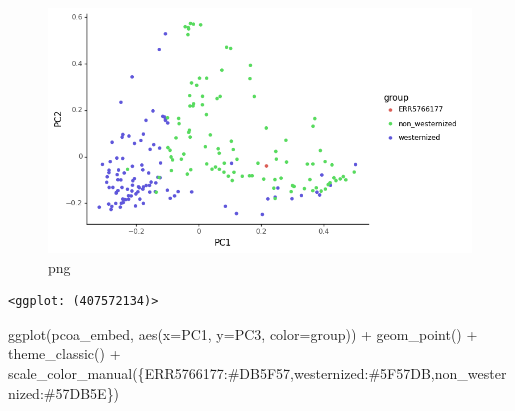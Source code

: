\documentclass[
  letterpaper,
]{book}
\newenvironment{Shaded}{}{}
\newcommand{\NormalTok}[1]{\textcolor[rgb]{0.14,0.16,0.18}{#1}}
\newcommand{\OperatorTok}[1]{\textcolor[rgb]{0.14,0.16,0.18}{#1}}
\newcommand{\StringTok}[1]{\textcolor[rgb]{0.01,0.18,0.38}{#1}}
\begin{document}
\begin{figure}

{\centering \includegraphics{assets/images/chapters/taxonomic-profiling/analysis_107_0.png}

}

\caption{png}

\end{figure}

\begin{verbatim}
<ggplot: (407572134)>
\end{verbatim}

\begin{Shaded}
\begin{Highlighting}[]
\NormalTok{ggplot(pcoa\_embed, aes(x}\OperatorTok{=}\StringTok{\textquotesingle{}PC1\textquotesingle{}}\NormalTok{, y}\OperatorTok{=}\StringTok{\textquotesingle{}PC3\textquotesingle{}}\NormalTok{, color}\OperatorTok{=}\StringTok{\textquotesingle{}group\textquotesingle{}}\NormalTok{)) }\OperatorTok{+}
\NormalTok{geom\_point() }\OperatorTok{+}
\NormalTok{theme\_classic() }\OperatorTok{+}
\NormalTok{scale\_color\_manual(\{}\StringTok{\textquotesingle{}ERR5766177\textquotesingle{}}\NormalTok{:}\StringTok{\textquotesingle{}\#DB5F57\textquotesingle{}}\NormalTok{,}\StringTok{\textquotesingle{}westernized\textquotesingle{}}\NormalTok{:}\StringTok{\textquotesingle{}\#5F57DB\textquotesingle{}}\NormalTok{,}\StringTok{\textquotesingle{}non\_westernized\textquotesingle{}}\NormalTok{:}\StringTok{\textquotesingle{}\#57DB5E\textquotesingle{}}\NormalTok{\})}
\end{Highlighting}
\end{Shaded}
\end{document}
